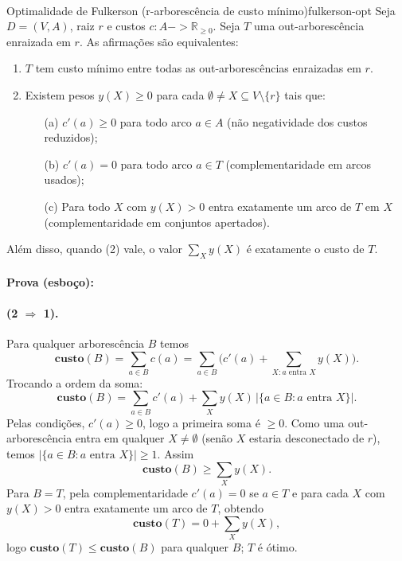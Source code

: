\documentclass[12pt,a4paper]{article}
\def\emph#1{#1}%
\def\to{->}%
\begin{document}
\paragraph{}
\begin{teobox}{Optimalidade de Fulkerson (r-arborescência de custo mínimo)}{fulkerson-opt}
Seja $D=(V,A)$, raiz $r$ e custos $c:A\to\mathbb{R}_{\ge 0}$. Seja $T$ uma out-arborescência enraizada em $r$. As afirmações são equivalentes: 
\begin{enumerate}\setlength{\itemsep}{4pt}
    \item $T$ tem custo mínimo entre todas as out-arborescências enraizadas em $r$.
    \item Existem pesos $y(X)\ge 0$ para cada $\emptyset\neq X\subseteq V\setminus\{r\}$ tais que:
    \begin{enumerate}\setlength{\itemsep}{2pt}
         \item[(a)] $c'(a)\ge 0$ para todo arco $a\in A$ (não negatividade dos custos reduzidos);
         \item[(b)] $c'(a)=0$ para todo arco $a\in T$ (complementaridade em arcos usados);
         \item[(c)] Para todo $X$ com $y(X)>0$ entra \emph{exatamente um} arco de $T$ em $X$ (complementaridade em conjuntos apertados).
    \end{enumerate}
\end{enumerate}
Além disso, quando (2) vale, o valor $\sum_X y(X)$ é exatamente o custo de $T$.

\paragraph{}
	\textbf{Prova (esboço):}

\paragraph{(2 $\Rightarrow$ 1).} Para qualquer arborescência $B$ temos
\[
 	\textbf{custo}(B) = \sum_{a\in B} c(a) = \sum_{a\in B} \Big( c'(a) + \sum_{X: a\text{ entra }X} y(X) \Big).
\]
Trocando a ordem da soma:
\[
 	\textbf{custo}(B) = \sum_{a\in B} c'(a) + \sum_X y(X)\,\big| \{a\in B: a \text{ entra } X\}\big|.
\]
Pelas condições, $c'(a)\ge 0$, logo a primeira soma é $\ge 0$. Como uma out-arborescência entra em qualquer $X\neq\emptyset$ (senão $X$ estaria desconectado de $r$), temos $|\{a\in B: a \text{ entra } X\}|\ge 1$. Assim
\[
 	\textbf{custo}(B) \ge \sum_X y(X).
\]
Para $B=T$, pela complementaridade $c'(a)=0$ se $a\in T$ e para cada $X$ com $y(X)>0$ entra \emph{exatamente} um arco de $T$, obtendo
\[
 	\textbf{custo}(T) = 0 + \sum_X y(X),
\]
logo $\textbf{custo}(T) \le \textbf{custo}(B)$ para qualquer $B$; $T$ é ótimo.


\end{teobox}
\end{document}
